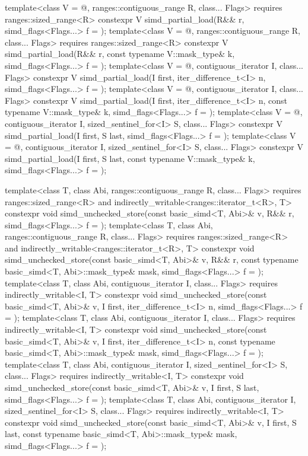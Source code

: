 \begin{codeblock}
{  template<class V = @\seebelow@, ranges::contiguous_range R, class... Flags>
    requires ranges::sized_range<R>
    constexpr V simd_partial_load(R&& r, simd_flags<Flags...> f = {});
  template<class V = @\seebelow@, ranges::contiguous_range R, class... Flags>
    requires ranges::sized_range<R>
    constexpr V simd_partial_load(R&& r, const typename V::mask_type& k, simd_flags<Flags...> f = {});
  template<class V = @\seebelow@, contiguous_iterator I, class... Flags>
    constexpr V simd_partial_load(I first, iter_difference_t<I> n, simd_flags<Flags...> f = {});
  template<class V = @\seebelow@, contiguous_iterator I, class... Flags>
    constexpr V simd_partial_load(I first, iter_difference_t<I> n, const typename V::mask_type& k,
                          simd_flags<Flags...> f = {});
  template<class V = @\seebelow@, contiguous_iterator I, sized_sentinel_for<I> S, class... Flags>
    constexpr V simd_partial_load(I first, S last, simd_flags<Flags...> f = {});
  template<class V = @\seebelow@, contiguous_iterator I, sized_sentinel_for<I> S, class... Flags>
    constexpr V simd_partial_load(I first, S last, const typename V::mask_type& k,
                          simd_flags<Flags...> f = {});

  template<class T, class Abi, ranges::contiguous_range R, class... Flags>
    requires ranges::sized_range<R> and indirectly_writable<ranges::iterator_t<R>, T>
    constexpr void simd_unchecked_store(const basic_simd<T, Abi>& v, R&& r, simd_flags<Flags...> f = {});
  template<class T, class Abi, ranges::contiguous_range R, class... Flags>
    requires ranges::sized_range<R> and indirectly_writable<ranges::iterator_t<R>, T>
    constexpr void simd_unchecked_store(const basic_simd<T, Abi>& v, R&& r,
                            const typename basic_simd<T, Abi>::mask_type& mask,
                            simd_flags<Flags...> f = {});
  template<class T, class Abi, contiguous_iterator I, class... Flags>
    requires indirectly_writable<I, T>
    constexpr void simd_unchecked_store(const basic_simd<T, Abi>& v, I first, iter_difference_t<I> n,
                            simd_flags<Flags...> f = {});
  template<class T, class Abi, contiguous_iterator I, class... Flags>
    requires indirectly_writable<I, T>
    constexpr void simd_unchecked_store(const basic_simd<T, Abi>& v, I first, iter_difference_t<I> n,
                            const typename basic_simd<T, Abi>::mask_type& mask,
                            simd_flags<Flags...> f = {});
  template<class T, class Abi, contiguous_iterator I, sized_sentinel_for<I> S, class... Flags>
    requires indirectly_writable<I, T>
    constexpr void simd_unchecked_store(const basic_simd<T, Abi>& v, I first, S last, simd_flags<Flags...> f = {});
  template<class T, class Abi, contiguous_iterator I, sized_sentinel_for<I> S, class... Flags>
    requires indirectly_writable<I, T>
    constexpr void simd_unchecked_store(const basic_simd<T, Abi>& v, I first, S last,
                            const typename basic_simd<T, Abi>::mask_type& mask,
                            simd_flags<Flags...> f = {});

}
\end{codeblock}
